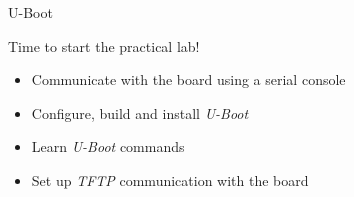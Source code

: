 \setuplabframe
{U-Boot}
{
  Time to start the practical lab!
  \begin{itemize}
  \item Communicate with the board using a serial console
  \item Configure, build and install {\em U-Boot}
  \item Learn {\em U-Boot} commands
  \item Set up {\em TFTP} communication with the board
  \end{itemize}
}
